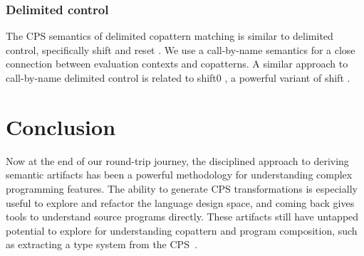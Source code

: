 \documentclass[sigplan,screen]{acmart}
\begin{document}
\subsubsection*{Delimited control}
%
The CPS semantics of delimited copattern matching is similar to delimited
control, specifically shift and reset
\cite{FunctionalAbstractionTypedContexts,AbstractingControl}.  We use a
call-by-name semantics for a close connection between evaluation contexts and
copatterns.  A similar approach to call-by-name delimited control
\cite{HerbelinG08} is related to shift0 \cite{DownenAriola2014CSCC}, a powerful
variant of shift \cite{materzok2011subtyping,materzok2012dynamic}.

\section{Conclusion}
\label{sec:conclusion}

Now at the end of our round-trip journey, the disciplined approach to deriving
semantic artifacts has been a powerful methodology for understanding complex
programming features.  The ability to generate CPS transformations is especially
useful to explore and refactor the language design space, and coming back gives
tools to understand source programs directly.  These artifacts still have
untapped potential to explore for understanding copattern and program
composition, such as extracting a type system from the CPS~\cite{FunctionalAbstractionTypedContexts}.



\clearpage




\appendix


\end{document}
